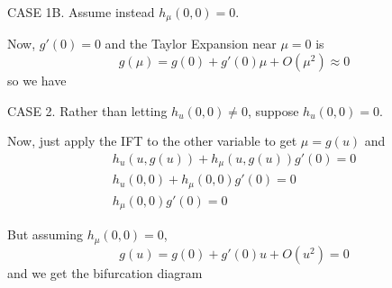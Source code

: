 \documentclass[12pt]{article}
\begin{document}
\begin{enumerate}
          CASE 1B. Assume instead $h_{\mu}(0, 0) = 0$.

          Now, $g'(0) = 0$ and the Taylor Expansion near $\mu = 0$ is
          \[g(\mu) = g(0) + g'(0) \mu + O(\mu^2) \approx 0\]
          so we have
          \begin{center}
              \color{black}
          \end{center}

          CASE 2. Rather than letting $h_u(0, 0) \neq 0$, suppose $h_u(0, 0) = 0$.

          Now, just apply the IFT to the other variable to get $\mu = g(u)$ and
          \begin{gather*}
              h_u(u, g(u)) + h_{\mu}(u, g(u)) g'(0) = 0\\
              h_u(0, 0) + h_{\mu}(0, 0) g'(0) = 0\\
              h_{\mu}(0, 0) g'(0) = 0
          \end{gather*}

          But assuming $h_{\mu}(0, 0) = 0$,
          \[g(u) = g(0) + g'(0)u + O(u^2) = 0\]
          and we get the bifurcation diagram


\end{enumerate}
\end{document}
